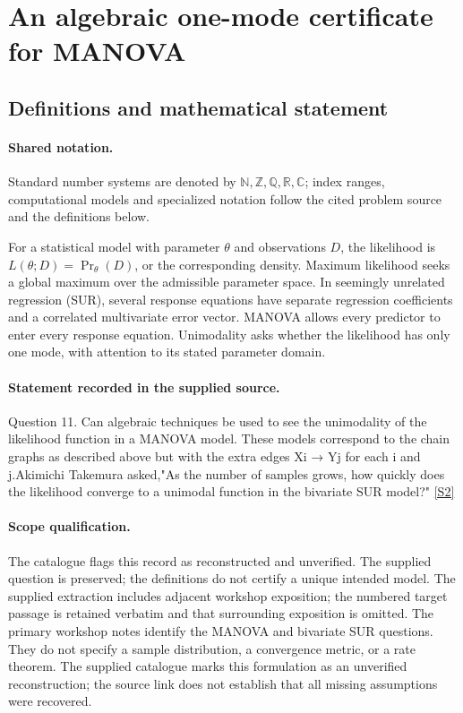 \documentclass[11pt]{article}
\newcommand{\sref}[2]{\hyperlink{source:#1:#2}{[S#2]}}
\begin{document}
\section{An algebraic one-mode certificate for MANOVA}\label{statement}

\subsection{Definitions and mathematical statement}

\paragraph{Shared notation.}Standard number systems are denoted by $\mathbb N,\mathbb Z,\mathbb Q,\mathbb R,\mathbb C$; index ranges, computational models and specialized notation follow the cited problem source and the definitions below.


For a statistical model with parameter $\theta$ and observations $D$, the likelihood is $L(\theta;D)=\Pr_\theta(D)$, or the corresponding density. Maximum likelihood seeks a global maximum over the admissible parameter space. In seemingly unrelated regression (SUR), several response equations have separate regression coefficients and a correlated multivariate error vector. MANOVA allows every predictor to enter every response equation. Unimodality asks whether the likelihood has only one mode, with attention to its stated parameter domain.
\paragraph{Statement recorded in the supplied source.}
Question 11. Can algebraic techniques be used to see the unimodality of the likelihood function in a MANOVA model. These models correspond to the chain graphs as described above but with the extra edges Xi → Yj for each i and j.Akimichi Takemura asked,"As the number of samples grows, how quickly does the likelihood converge to a unimodal function in the bivariate SUR model?" \sref{statement}{2}
\paragraph{Scope qualification.}
The catalogue flags this record as reconstructed and unverified. The supplied question is preserved; the definitions do not certify a unique intended model. The supplied extraction includes adjacent workshop exposition; the numbered target passage is retained verbatim and that surrounding exposition is omitted. The primary workshop notes identify the MANOVA and bivariate SUR questions. They do not specify a sample distribution, a convergence metric, or a rate theorem.
The supplied catalogue marks this formulation as an unverified reconstruction; the source link does not establish that all missing assumptions were recovered.
\end{document}
